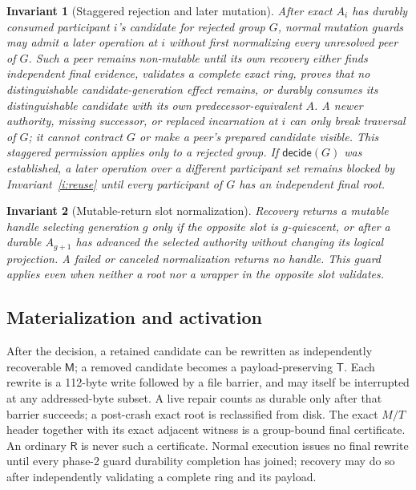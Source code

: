 \documentclass[10pt,twocolumn]{article}
\newtheorem{invariant}{Invariant}
\theoremstyle{remark}
\newcommand{\Root}{\mathsf{R}}
\newcommand{\Materialized}{\mathsf{M}}
\newcommand{\Tombstone}{\mathsf{T}}
\begin{document}
\begin{invariant}[Staggered rejection and later mutation]\label{i:staggered}
After exact $A_i$ has durably consumed participant $i$'s candidate for rejected group $G$, normal
mutation guards may admit a later operation at $i$ without first normalizing every unresolved peer
of $G$. Such a peer remains non-mutable until its own recovery either finds independent final
evidence, validates a complete exact ring, proves that no distinguishable candidate-generation
effect remains, or durably consumes its distinguishable candidate with its own
predecessor-equivalent $A$. A newer authority, missing successor, or replaced incarnation at
$i$ can only break traversal of $G$; it cannot contract $G$ or make a peer's prepared candidate
visible. This staggered permission applies only to a rejected group. If $\mathsf{decide}(G)$ was
established, a later operation over a different participant set remains blocked by
Invariant~\ref{i:reuse} until every participant of $G$ has an independent final root.
\end{invariant}

\begin{invariant}[Mutable-return slot normalization]\label{i:normalize}
Recovery returns a mutable handle selecting generation $g$ only if the opposite slot is
$g$-quiescent, or after a durable $A_{g+1}$ has advanced the selected authority without changing
its logical projection. A failed or canceled normalization returns no handle. This guard applies
even when neither a root nor a wrapper in the opposite slot validates.
\end{invariant}

\subsection{Materialization and activation}

After the decision, a retained candidate can be rewritten as independently recoverable
$\Materialized$; a removed candidate becomes a payload-preserving $\Tombstone$. Each rewrite is a
112-byte write followed by a file barrier, and may itself be interrupted at any addressed-byte
subset. A live repair counts as durable only after that barrier succeeds; a post-crash exact root is
reclassified from disk. The exact $M/T$ header together with its exact adjacent witness is a
group-bound final certificate. An ordinary $\Root$ is never such a certificate. Normal execution
issues no final rewrite until every phase-2 guard durability completion has joined; recovery may do
so after independently validating a complete ring and its payload.
\end{document}
